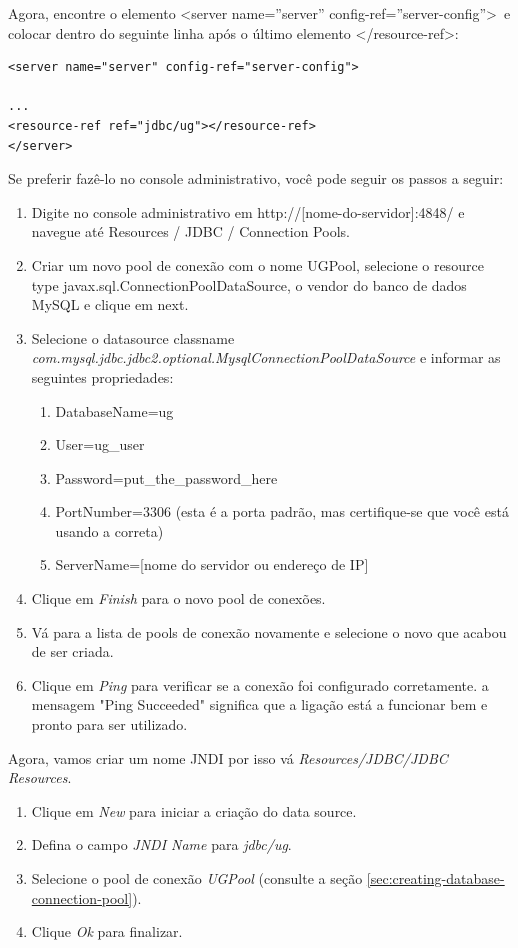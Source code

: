 \documentclass[envcountsame,envcountchap]{svmono}
\begin{document}
Agora, encontre o elemento \textless server name=''server'' config-ref=''server-config''\textgreater \ e colocar dentro do seguinte linha após o último elemento \textless /resource-ref\textgreater :

\begin{verbatim}
<server name="server" config-ref="server-config">

...
<resource-ref ref="jdbc/ug"></resource-ref>
</server>
\end{verbatim}

Se preferir fazê-lo no console administrativo, você pode seguir os passos a seguir:

\begin{enumerate}
\item  Digite no console administrativo em http://[nome-do-servidor]:4848/ e navegue até Resources / JDBC / Connection Pools.
\item Criar um novo pool de conexão com o nome UGPool, selecione o resource type javax.sql.ConnectionPoolDataSource, o vendor do banco de dados MySQL e clique em next.
\item Selecione o datasource classname \\ \textit{com.mysql.jdbc.jdbc2.optional.MysqlConnectionPoolDataSource} e informar as seguintes propriedades:
   \begin{enumerate}
   \item DatabaseName=ug
   \item User=ug\_user
   \item Password=put\_the\_password\_here
   \item PortNumber=3306 (esta é a porta padrão, mas certifique-se
    que você está usando a correta)
   \item ServerName=[nome do servidor ou endereço de IP]
   \end{enumerate}
\item Clique em \textit{Finish} para o novo pool de conexões.
\item Vá para a lista de pools de conexão novamente e selecione o novo que acabou de ser criada.
\item Clique em \textit{Ping} para verificar se a conexão foi configurado corretamente. a mensagem "Ping Succeeded" significa que a ligação está a funcionar bem e pronto para ser utilizado.
\end{enumerate}

Agora, vamos criar um nome JNDI por isso vá \textit{Resources/JDBC/JDBC Resources}.

\begin{enumerate}
\item Clique em \textit{New} para iniciar a criação do data source.
\item Defina o campo \textit{JNDI Name} para \textit{jdbc/ug}.
\item Selecione o pool de conexão \textit{UGPool} (consulte a seção \ref{sec:creating-database-connection-pool}).
\item Clique \textit{Ok} para finalizar.
\end{enumerate}
\end{document}
